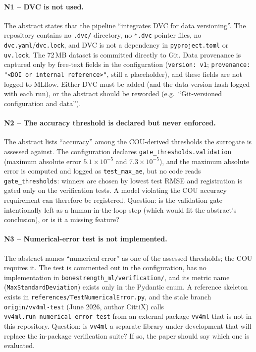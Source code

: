 \paragraph{N1 -- DVC is not used.}
The abstract states that the pipeline ``integrates DVC for data versioning''.
The repository contains no \texttt{.dvc/} directory, no \texttt{*.dvc}
pointer files, no \texttt{dvc.yaml}/\texttt{dvc.lock}, and DVC is not a
dependency in \texttt{pyproject.toml} or \texttt{uv.lock}. The 72\,MB dataset
is committed directly to Git. Data provenance is captured only by free-text
fields in the configuration (\texttt{version: v1};
\texttt{provenance: "<DOI or internal reference>"}, still a placeholder), and
these fields are not logged to MLflow. Either DVC must be added (and the
data-version hash logged with each run), or the abstract should be reworded
(e.g.\ ``Git-versioned configuration and data'').

\paragraph{N2 -- The accuracy threshold is declared but never enforced.}
The abstract lists ``accuracy'' among the COU-derived thresholds the surrogate
is assessed against. The configuration declares
\texttt{gate\_thresholds.validation} (maximum absolute error
$5.1\times10^{-5}$ and $7.3\times10^{-5}$), and the maximum absolute error is
computed and logged as \texttt{test\_max\_ae}, but no code reads
\texttt{gate\_thresholds}: winners are chosen by lowest test RMSE and
registration is gated only on the verification tests. A model violating the
COU accuracy requirement can therefore be registered. Question: is the
validation gate intentionally left as a human-in-the-loop step (which would
fit the abstract's conclusion), or is it a missing feature?

\paragraph{N3 -- Numerical-error test is not implemented.}
The abstract names ``numerical error'' as one of the assessed thresholds; the
COU requires it. The test is commented out in the configuration, has no
implementation in \texttt{bonestrength\_ml/verification/}, and its metric
name (\texttt{MaxStandardDeviation}) exists only in the Pydantic enum. A
reference skeleton exists in \texttt{references/TestNumericalError.py}, and
the stale branch \texttt{origin/vv4ml-test} (June 2026, author CittiX) calls
\texttt{vv4ml.run\_numerical\_error\_test} from an external package
\texttt{vv4ml} that is not in this repository. Question: is \texttt{vv4ml} a
separate library under development that will replace the in-package
verification suite? If so, the paper should say which one is evaluated.

